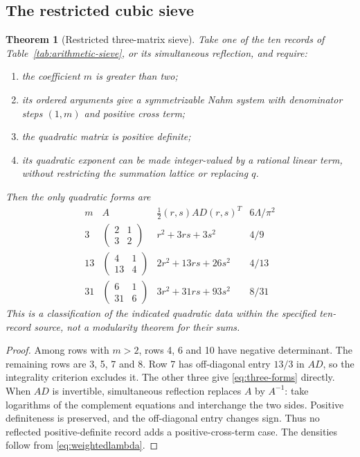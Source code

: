 \documentclass[11pt,reqno]{amsart}
\newtheorem{theorem}{Theorem}[section]
\theoremstyle{remark}
\numberwithin{equation}{section}
\begin{document}
\subsection{The restricted cubic sieve}
\begin{theorem}[Restricted three-matrix sieve]\label{thm:three-matrix}
Take one of the ten records of Table~\ref{tab:arithmetic-sieve}, or its
simultaneous reflection, and require:
\begin{enumerate}
\item the coefficient $m$ is greater than two;
\item its ordered arguments give a symmetrizable Nahm system with
denominator steps $(1,m)$ and positive cross term;
\item the quadratic matrix is positive definite;
\item its quadratic exponent can be made integer-valued by a rational
linear term, without restricting the summation lattice or replacing $q$.
\end{enumerate}
Then the only quadratic forms are
\begin{equation}\label{eq:three-forms}
\begin{array}{c|c|c|c}
m&A&\tfrac12(r,s)AD(r,s)^T&6\Lambda/\pi^2\\\hline
3&\left(\begin{smallmatrix}2&1\\3&2\end{smallmatrix}\right)
 &r^2+3rs+3s^2&4/9\\[2pt]
13&\left(\begin{smallmatrix}4&1\\13&4\end{smallmatrix}\right)
 &2r^2+13rs+26s^2&4/13\\[2pt]
31&\left(\begin{smallmatrix}6&1\\31&6\end{smallmatrix}\right)
 &3r^2+31rs+93s^2&8/31
\end{array}
\end{equation}
This is a classification of the indicated quadratic data within the
specified ten-record source, not a modularity theorem for their sums.
\end{theorem}
\begin{proof}
Among rows with $m>2$, rows 4, 6 and 10 have negative determinant.
The remaining rows are 3, 5, 7 and 8. Row 7 has off-diagonal entry
$13/3$ in $AD$, so the integrality criterion excludes it. The other
three give \eqref{eq:three-forms} directly. When $AD$ is invertible,
simultaneous reflection replaces $A$ by $A^{-1}$: take logarithms of
the complement equations and interchange the two sides. Positive
definiteness is preserved, and the off-diagonal entry changes sign.
Thus no reflected positive-definite record adds a positive-cross-term
case. The densities follow from \eqref{eq:weightedlambda}.
\end{proof}
\end{document}
